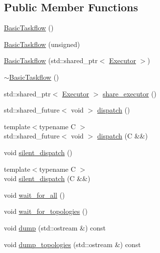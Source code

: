\subsection*{Public Member Functions}
\begin{DoxyCompactItemize}
\item 
\hyperlink{classtf_1_1BasicTaskflow_ab077a9419b9cb6cbc9f9647c621c8c71}{Basic\+Taskflow} ()
\item 
\hyperlink{classtf_1_1BasicTaskflow_a005b6e5632ad3acd52406adf7d3e84e5}{Basic\+Taskflow} (unsigned)
\item 
\hyperlink{classtf_1_1BasicTaskflow_aa6301c0e9667a4a0ecd30f4d654ac135}{Basic\+Taskflow} (std\+::shared\+\_\+ptr$<$ \hyperlink{classtf_1_1BasicTaskflow_ab183cd063ba999ac62b5d4e9bb89247d}{Executor} $>$)
\item 
\hyperlink{classtf_1_1BasicTaskflow_ae820a9ab3cad471a591da4de749752ae}{$\sim$\+Basic\+Taskflow} ()
\item 
std\+::shared\+\_\+ptr$<$ \hyperlink{classtf_1_1BasicTaskflow_ab183cd063ba999ac62b5d4e9bb89247d}{Executor} $>$ \hyperlink{classtf_1_1BasicTaskflow_abe76e5288016861aaf1dafc0218d3084}{share\+\_\+executor} ()
\item 
std\+::shared\+\_\+future$<$ void $>$ \hyperlink{classtf_1_1BasicTaskflow_a848e425f67b49a8a7ac21f6b791999c5}{dispatch} ()
\item 
{\footnotesize template$<$typename C $>$ }\\std\+::shared\+\_\+future$<$ void $>$ \hyperlink{classtf_1_1BasicTaskflow_ae644520b734078d061e3ceafc7d982ad}{dispatch} (C \&\&)
\item 
void \hyperlink{classtf_1_1BasicTaskflow_a0126001a2bd8603af4827049578629cb}{silent\+\_\+dispatch} ()
\item 
{\footnotesize template$<$typename C $>$ }\\void \hyperlink{classtf_1_1BasicTaskflow_a8d27a4ec6768473a46460a39ba7c572c}{silent\+\_\+dispatch} (C \&\&)
\item 
void \hyperlink{classtf_1_1BasicTaskflow_a37ef86998f23ee7315be032c40fe815e}{wait\+\_\+for\+\_\+all} ()
\item 
void \hyperlink{classtf_1_1BasicTaskflow_a8f0ce2026118e97b83cbd727ed0932af}{wait\+\_\+for\+\_\+topologies} ()
\item 
void \hyperlink{classtf_1_1BasicTaskflow_aec75723fc4f48197bc92748ed8b12d2a}{dump} (std\+::ostream \&) const
\item 
void \hyperlink{classtf_1_1BasicTaskflow_a6ada71950f0e3384f2ab95814bbc7c3f}{dump\+\_\+topologies} (std\+::ostream \&) const

\end{DoxyCompactItemize}
